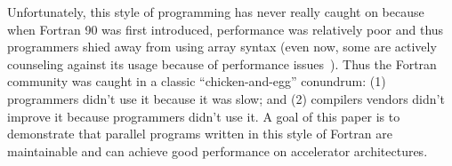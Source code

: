


Unfortunately, this style of programming has never really caught on because
when Fortran 90 was first introduced, performance was relatively poor and thus
programmers shied away from using array syntax (even now, some are actively
counseling against its usage because of performance issues~\cite{Levesque:SC08}).
Thus the Fortran community was caught in a classic ``chicken-and-egg''
conundrum: (1) programmers didn't use it because it was slow; and (2)
compilers vendors didn't improve it because programmers didn't use it.
A goal of this paper is to demonstrate that parallel programs written in
this style of Fortran are maintainable and can achieve good performance on
accelerator architectures.

